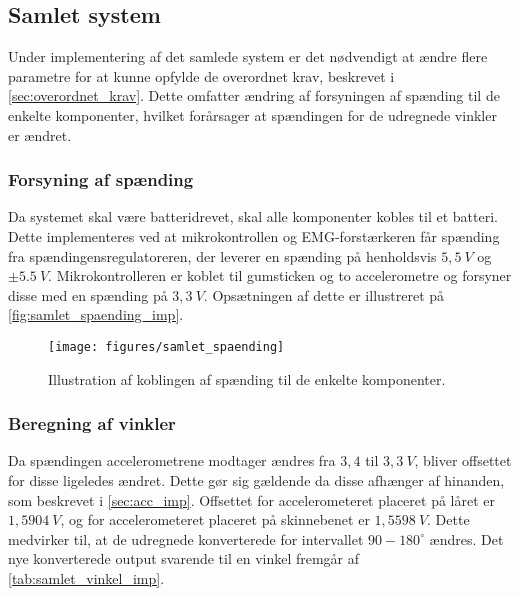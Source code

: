 \subsection{Samlet system}
Under implementering af det samlede system er det nødvendigt at ændre flere parametre for at kunne opfylde de overordnet krav, beskrevet i  \autoref{sec:overordnet_krav}. Dette omfatter ændring af forsyningen af spænding til de enkelte komponenter, hvilket forårsager at spændingen for de udregnede vinkler er ændret.

\subsubsection{Forsyning af spænding}
Da systemet skal være batteridrevet, skal alle komponenter kobles til et batteri. Dette implementeres ved at mikrokontrollen og EMG-forstærkeren får spænding fra spændingensregulatoreren, der leverer en spænding på henholdsvis $5,5~V$ og $\pm 5.5~V$. Mikrokontrolleren er koblet til gumsticken og to accelerometre og forsyner disse med en spænding på $3,3~V$. Opsætningen af dette er illustreret på \autoref{fig:samlet_spaending_imp}. 

\begin{figure}[H]
\centering
\texttt{[image: figures/samlet\_spaending]}
\caption{Illustration af koblingen af spænding til de enkelte komponenter.}
\label{fig:samlet_spaending_imp}
\end{figure}

\subsubsection{Beregning af vinkler}
Da spændingen accelerometrene modtager ændres fra $3,4$ til $3,3~V$, bliver offsettet for disse ligeledes ændret. Dette gør sig gældende da disse afhænger af hinanden, som  beskrevet i \autoref{sec:acc_imp}. Offsettet for accelerometeret placeret på låret er $1,5904~V$, og for accelerometeret placeret på skinnebenet er $1,5598~V$. Dette medvirker til, at de udregnede konverterede for intervallet $90-180^{\circ}$ ændres. Det nye konverterede output svarende til en vinkel fremgår af \autoref{tab:samlet_vinkel_imp}. 

